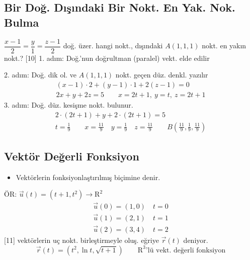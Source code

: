 \documentclass[11pt,a4paper]{article}
\begin{document}
\subsection{Bir Doğ. Dışındaki Bir Nokt. En Yak. Nok. Bulma}
$\dfrac{x-1}{2}=\dfrac{y}{1}=\dfrac{z-1}{2}$ doğ. üzer. hangi nokt., dışındaki $A(1,1,1)$ nokt. en yakın nokt.?
[10]
1. adım: Doğ.'nun doğrultman (paralel) vekt. elde edilir

2. adım: Doğ. dik ol. ve $A(1,1,1)$ nokt. geçen düz. denkl. yazılır
\begin{gather*}
(x-1)\cdot2+(y-1)\cdot1+2(z-1)=0\\
2x+y+2z=5\qquad x=2t+1,\ y=t,\ z=2t+1
\end{gather*}
3. adım: Doğ. düz. kesişme nokt. bulunur.
\begin{gather*}
2\cdot(2t+1)+y+2\cdot(2t+1)=5\\
t=\frac19\qquad x=\frac{11}{9}\quad y=\frac19\quad z=\frac{11}{9}\qquad B\left(\frac{11}{9},\frac19,\frac{11}{9}\right)
\end{gather*}

\subsection{Vektör Değerli Fonksiyon}
\begin{itemize}[nosep]
\item Vektörlerin fonksiyonlaştırılmış biçimine denir.
\end{itemize}
ÖR: $\vec u(t)=(t+1,t^2)\to\mathrm{R}^2$
\begin{gather*}
\vec u(0)=(1,0)\quad t=0\\
\vec u(1)=(2,1)\quad t=1\\
\vec u(2)=(3,4)\quad t=2
\end{gather*}
[11]
vektörlerin uç nokt. birleştirmeyle oluş. eğriye $\vec r(t)$ deniyor.
\[ \vec r(t)=\left(t^2,\ln t,\sqrt{t+1}\right)\qquad \mathrm{R}^3\text{'lü vekt. değerli fonksiyon} \]
\end{document}
